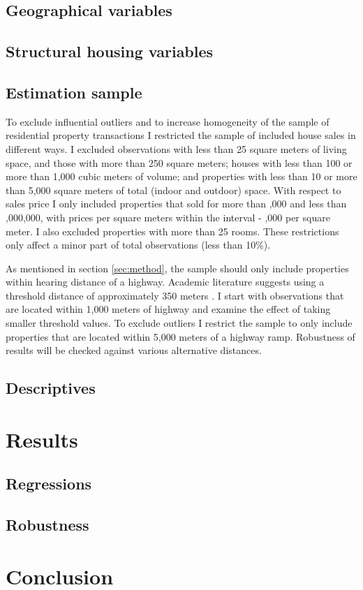 \documentclass[12pt]{scrartcl}
\begin{document}
		\subsection{Geographical variables}
		
		\subsection{Structural housing variables}
	
		\subsection{Estimation sample}
		To exclude influential outliers and to increase homogeneity of the sample of residential property transactions I restricted the sample of included house sales in different ways. I excluded observations with less than 25 square meters of living space, and those with more than 250 square meters; houses with less than 100 or more than 1,000 cubic meters of volume; and properties with less than 10 or more than 5,000 square meters of total (indoor and outdoor) space. With respect to sales price I only included properties that sold for more than ,000 and less than ,000,000, with prices per square meters within the interval  - ,000 per square meter. I also excluded properties with more than 25 rooms. These restrictions only affect a minor part of total observations (less than 10\%).
		
		As mentioned in section \ref{sec:method}, the sample should only include properties within hearing distance of a highway. Academic literature suggests using a threshold distance of approximately 350 meters \citep{Nelson1982}. I start with observations that are located within 1,000 meters of highway and examine the effect of taking smaller threshold values. To exclude outliers I restrict the sample to only include properties that are located within 5,000 meters of a highway ramp. Robustness of results will be checked against various alternative distances.
		
		\subsection{Descriptives}
	
	\section{Results}
	\label{sec:results}
	
		\subsection{Regressions}
	
		\subsection{Robustness}
	
	\section{Conclusion}
	\label{sec:conclusion}
	
	
	
	
	
\end{document}
